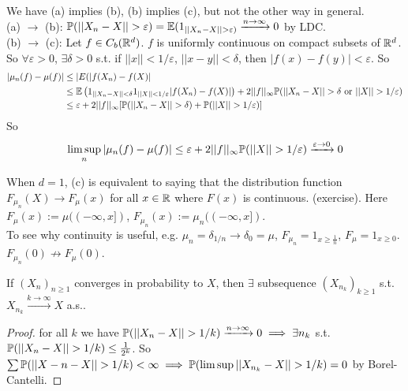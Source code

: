 \documentclass[a4paper]{article}
\begin{document}
\begin{rem}
We have (a) implies (b), (b) implies (c), but not the other way in general.\\
(a) $\to$ (b): $\P(||X_n-X|| > \varepsilon) = \E(1_{||X_n-X|| > \varepsilon)} \xrightarrow{n \to \infty} 0$ by LDC.\\
(b) $\to$ (c): Let $f \in C_b (\R^d)$. $f$ is uniformly continuous on compact subsets of $\R^d$.\\
So $\forall \varepsilon>0$, $\exists \delta >0$ s.t. if $||x|| < 1/\varepsilon$, $||x-y|| < \delta$, then $|f(x) - f(y) | < \varepsilon$. So
\begin{equation*}
\begin{aligned}
|\mu_n (f) - \mu(f)| &\leq |E(|f(X_n) - f(X)|\\
&\leq \E\left(1_{||X_n-X||<\delta} 1_{||X||<1/\varepsilon} |f(X_n) -f(X)|\right) + 2||f||_\infty \P(||X_n-X||>\delta \text{ or } ||X||>1/\varepsilon)\\
&\leq \varepsilon+2||f||_\infty [\P(||X_n-X||>\delta ) + \P(||X||>1/\varepsilon)]
\end{aligned}
\end{equation*}
So
\begin{equation*}
\begin{aligned}
\limsup_n |\mu_n(f) - \mu(f)| \leq \varepsilon+2||f||_\infty \P(||X||>1/\varepsilon) \xrightarrow{\varepsilon \to 0} 0
\end{aligned}
\end{equation*}
\end{rem}

\begin{rem}
When $d=1$, (c) is equivalent to saying that the distribution function $F_{\mu_n} (X) \to F_\mu(x)$ for all $x \in \R$ where $F(x)$ is continuous. (exercise). Here $F_\mu(x) := \mu((-\infty,x])$, $F_{\mu_n} (x) := \mu_n((-\infty,x])$. \\
To see why continuity is useful, e.g. $\mu_n = \delta_{1/n} \to \delta_0 = \mu$, $F_{\mu_n} = 1_{x \geq \frac{1}{n}}$, $F_\mu = 1_{x \geq 0}$. $F_{\mu_n}(0) \not\to F_\mu(0)$.
\end{rem}

\begin{prop}
If $(X_n)_{n \geq 1}$ converges in probability to $X$, then $\exists$ subsequence $(X_{n_k})_{k \geq 1}$ s.t. $X_{n_k} \xrightarrow{k \to \infty} X$ a.s..\\
\begin{proof}
for all $k$ we have $\P(||X_n - X|| > 1/k) \xrightarrow{n \to \infty} 0 \implies \exists n_k$ s.t. $\P(||X_n-X|| > 1/k) \leq \frac{1}{2^k}$. So $\sum \P(||X-n-X|| > 1/k) < \infty \implies \P(\limsup ||X_{n_k} - X|| > 1/k) = 0$ by Borel-Cantelli.
\end{proof}
\end{prop}
\end{document}
